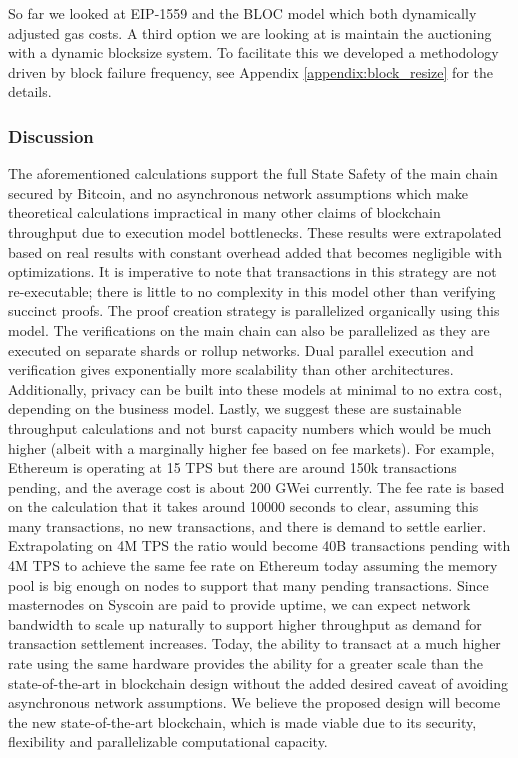 \documentclass[peerreview]{ieeesyscoin}
\begin{document}
So far we looked at EIP-1559 and the BLOC model which both dynamically adjusted gas costs. A third option we are looking at is maintain the auctioning with a dynamic blocksize system. To facilitate this we developed a methodology driven by block failure frequency, see Appendix \ref{appendix:block_resize} for the details. 

\subsubsection{Discussion}

The aforementioned calculations support the full State Safety of the main chain secured by Bitcoin, and no asynchronous network assumptions which make theoretical calculations impractical in many other claims of blockchain throughput due to execution model bottlenecks. These results were extrapolated based on real results with constant overhead added that becomes negligible with optimizations. It is imperative to  note that transactions in this strategy are not re-executable; there is little to no complexity in this model other than verifying succinct proofs. The proof creation strategy is parallelized organically using this model. The verifications on the main chain can also be parallelized as they are executed on separate shards or rollup networks. Dual parallel execution and verification gives exponentially more scalability than other architectures. Additionally, privacy can be built into these models at minimal to no extra cost, depending on the business model. Lastly, we suggest  these are sustainable throughput calculations and not burst capacity numbers which would be much higher (albeit with a marginally higher fee based on fee markets). For example, Ethereum is operating at 15 TPS but there are around 150k transactions pending, and the average cost is about 200 GWei currently. The fee rate is based on the calculation that it  takes around 10000 seconds to clear, assuming this many transactions, no new transactions, and there is demand to settle earlier. Extrapolating on 4M TPS the ratio would become 40B transactions pending with 4M TPS to achieve the same fee rate on Ethereum today assuming the memory pool is big enough on nodes to support that many pending transactions. Since masternodes on Syscoin are paid to provide uptime, we can expect network bandwidth to scale up naturally to support higher throughput as demand for transaction settlement increases. Today, the ability to transact at a much higher rate using the same hardware provides the ability for a greater scale than the state-of-the-art in blockchain design without the added desired caveat of avoiding asynchronous network assumptions. We believe the proposed design will become the new state-of-the-art blockchain, which is made viable due to its security, flexibility and parallelizable computational capacity.
\end{document}
